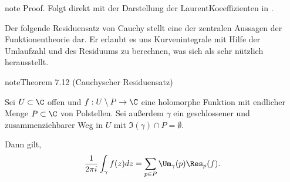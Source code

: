 \documentclass[letterpaper,10pt,german]{jupyterBook}
\begin{document}
\begin{sphinxadmonition}{note}
\sphinxAtStartPar
Proof. Folgt direkt mit der Darstellung der Laurent\sphinxhyphen{}Koeeffizienten in {\hyperref[\detokenize{complexanalysis/residuensatz:lem:laurent}]{}}.
\end{sphinxadmonition}

\sphinxAtStartPar
Der folgende Residuensatz von Cauchy stellt eine der zentralen Aussagen der Funktionentheorie dar.
Er erlaubt es uns Kurvenintegrale mit Hilfe der Umlaufzahl und des Residuums zu berechnen, was sich als sehr nützlich herausstellt.
\label{complexanalysis/residuensatz:theorem-14}
\begin{sphinxadmonition}{note}{Theorem 7.12 (Cauchyscher Residuensatz)}



\sphinxAtStartPar
Sei \(U \subset \C\) offen und \(f:U\setminus P \to \C\) eine holomorphe Funktion mit endlicher Menge \(P \subset \C\) von Polstellen.
Sei außerdem \(\gamma\) ein geschlossener und zusammenziehbarer Weg in \(U\) mit \(\Im(\gamma) \cap P = \emptyset\).

\sphinxAtStartPar
Dann gilt,
\begin{equation*}
\begin{split}\frac{1}{2\pi i}\int_\gamma f(z) dz = \sum_{p \in P} \Um_\gamma(p) \Res_{p}(f).\end{split}
\end{equation*}\end{sphinxadmonition}
\end{document}
